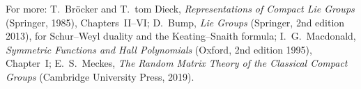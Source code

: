 For more: T.~Bröcker and T.~tom Dieck, \emph{Representations of Compact Lie Groups} (Springer, 1985), Chapters~II--VI; D.~Bump, \emph{Lie Groups} (Springer, 2nd edition 2013), for Schur--Weyl duality and the Keating--Snaith formula; I.~G.~Macdonald, \emph{Symmetric Functions and
Hall Polynomials} (Oxford, 2nd edition 1995), Chapter~I; E.~S.~Meckes, \emph{The Random Matrix Theory of the Classical Compact Groups} (Cambridge University Press, 2019).

